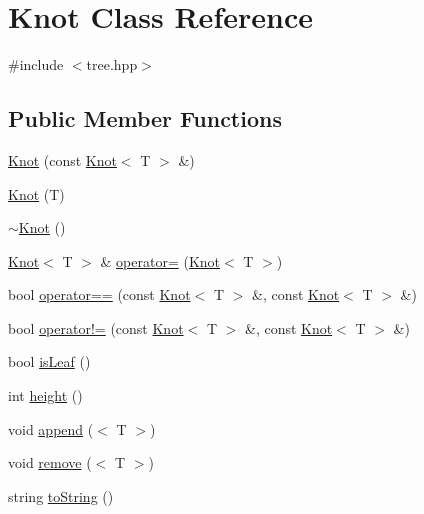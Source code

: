 \hypertarget{class_knot}{\section{Knot Class Reference}
\label{class_knot}
}


{\ttfamily \#include $<$tree.\-hpp$>$}

\subsection*{Public Member Functions}
\begin{DoxyCompactItemize}
\item 
\hyperlink{class_knot_a880817f2e6d49620c9436308f8dae2b4}{Knot} (const \hyperlink{class_knot}{Knot}$<$ T $>$ \&)
\item 
\hyperlink{class_knot_ab2db088c1bcedf201b50f0d8786707f2}{Knot} (T)
\item 
\hyperlink{class_knot_abe4462897569b79486b2b6cac03c3702}{$\sim$\-Knot} ()
\item 
\hyperlink{class_knot}{Knot}$<$ T $>$ \& \hyperlink{class_knot_aeb819a0e20abb34efb8723ed87b8709f}{operator=} (\hyperlink{class_knot}{Knot}$<$ T $>$)
\item 
bool \hyperlink{class_knot_a8010e44411d47b302c1fe0afa3ac8c31}{operator==} (const \hyperlink{class_knot}{Knot}$<$ T $>$ \&, const \hyperlink{class_knot}{Knot}$<$ T $>$ \&)
\item 
bool \hyperlink{class_knot_a9c74db22b55223425df18b137046031c}{operator!=} (const \hyperlink{class_knot}{Knot}$<$ T $>$ \&, const \hyperlink{class_knot}{Knot}$<$ T $>$ \&)
\item 
bool \hyperlink{class_knot_a68386ab11edd866495dfbcf61cab0e01}{is\-Leaf} ()
\item 
int \hyperlink{class_knot_a9988255f899344c9f16797c4b918ac7b}{height} ()
\item 
void \hyperlink{class_knot_a039c18dfa7c3b32f4d475e86fe7c441c}{append} ($<$ T $>$)
\item 
void \hyperlink{class_knot_a05943c8618bec210da74461698a79ccc}{remove} ($<$ T $>$)
\item 
string \hyperlink{class_knot_af8b780d91b4f2a43556c7b53c8f6243c}{to\-String} ()
\end{DoxyCompactItemize}


